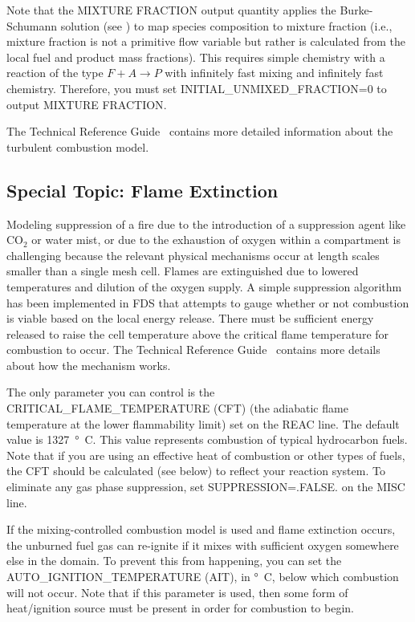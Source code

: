 \documentclass[11pt]{book}
\begin{document}
Note that the {\ct MIXTURE FRACTION} output quantity applies the Burke-Schumann solution (see \cite{Turns:1996}) to map species composition to mixture fraction (i.e., mixture fraction is not a primitive flow variable but rather is calculated from the local fuel and product mass fractions).  This requires simple chemistry with a reaction of the type $\si{F} + \si{A} \rightarrow \si {P}$ with infinitely fast mixing and infinitely fast chemistry.  Therefore, you must set {\ct INITIAL\_UNMIXED\_FRACTION=0} to output {\ct MIXTURE FRACTION}.

The Technical Reference Guide~\cite{FDS_Math_Guide} contains more detailed information about the turbulent combustion model.

\subsection{Special Topic: Flame Extinction}

\label{info:extinction}

Modeling suppression of a fire due to the introduction of a suppression agent like CO$_2$ or water mist, or due to the exhaustion of oxygen within a compartment is challenging because
the relevant physical mechanisms occur at length scales smaller than a single mesh cell. Flames are extinguished due to lowered temperatures and dilution of the oxygen supply. A simple
suppression algorithm has been implemented in FDS that attempts to gauge whether or not combustion is viable based on the local energy release. There must be sufficient energy released to raise the cell temperature above the critical flame temperature for combustion to occur. The Technical Reference Guide~\cite{FDS_Math_Guide} contains more details about how the mechanism works.

The only parameter you can control is the {\ct CRITICAL\_FLAME\_TEMPERATURE} (CFT) (the adiabatic flame temperature at the lower flammability limit) set on the {\ct REAC} line. The default value is 1327~\si{\degree C}. This value represents combustion of typical hydrocarbon fuels. Note that if you are using an effective heat of combustion or other types of fuels, the CFT should be calculated (see below) to reflect your reaction system. To eliminate any gas phase suppression, set {\ct SUPPRESSION=.FALSE.} on the {\ct MISC} line.

If the mixing-controlled combustion model is used and flame extinction occurs, the unburned fuel gas can re-ignite if it mixes with sufficient oxygen somewhere else in the domain. To prevent this from happening, you can set the {\ct AUTO\_IGNITION\_TEMPERATURE} (AIT), in \si{\degree C}, below which combustion will not occur. Note that if this parameter is used, then some form of heat/ignition source must be present in order for combustion to begin.
\end{document}
